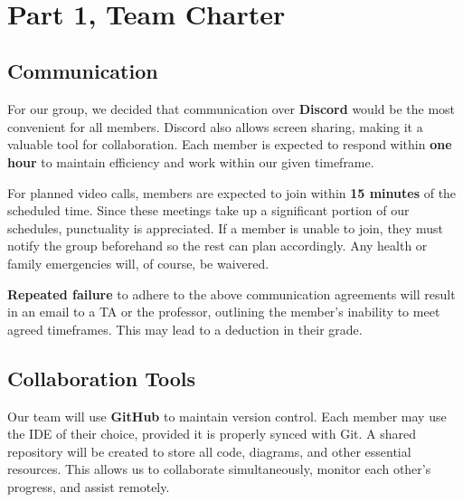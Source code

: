 \documentclass{article}
\begin{document}
\begin{onehalfspace}

\tableofcontents
{}
~\\
\newpage


\section*{Part 1, Team Charter}
\subsection*{Communication}
\large{For our group, we decided that communication over \textbf{Discord} would be the most convenient for all members. Discord also allows screen sharing, making it a valuable tool for collaboration. Each member is expected to respond within \textbf{one hour} to maintain efficiency and work within our given timeframe.

For planned video calls, members are expected to join within \textbf{15 minutes} of the scheduled time. Since these meetings take up a significant portion of our schedules, punctuality is appreciated. If a member is unable to join, they must notify the group beforehand so the rest can plan accordingly. Any health or family emergencies will, of course, be waivered.

\textbf{Repeated failure} to adhere to the above communication agreements will result in an email to a TA or the professor, outlining the member's inability to meet agreed timeframes. This may lead to a deduction in their grade.

\subsection*{Collaboration Tools}

Our team will use \textbf{GitHub} to maintain version control. Each member may use the IDE of their choice, provided it is properly synced with Git. A shared repository will be created to store all code, diagrams, and other essential resources. This allows us to collaborate simultaneously, monitor each other's progress, and assist remotely.

}
\end{onehalfspace}
\end{document}

